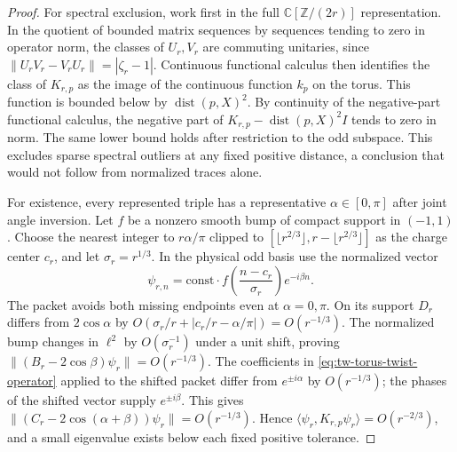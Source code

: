 \begin{proof}
For spectral exclusion, work first in the full
\(\mathbb C[\mathbb Z/(2r)]\) representation.  In the quotient of bounded
matrix sequences by sequences tending to zero in operator norm, the
classes of \(U_r,V_r\) are commuting unitaries, since
\(\|U_rV_r-V_rU_r\|=|\zeta_r-1|\).
Continuous functional calculus then identifies the class of \(K_{r,p}\)
as the image of the continuous function \(k_p\) on the torus.  This
function is bounded below by \(\operatorname{dist}(p,X)^2\).
By continuity of the negative-part functional calculus, the negative
part of \(K_{r,p}-\operatorname{dist}(p,X)^2 I\) tends to zero in norm.
The same lower bound holds after restriction to the odd subspace.
This excludes sparse spectral outliers at any fixed positive distance,
a conclusion that would not follow from normalized traces alone.

For existence, every represented triple has a representative
\(\alpha\in[0,\pi]\) after joint angle inversion.  Let \(f\) be a nonzero
smooth bump of compact support in \((-1,1)\).  Choose the nearest integer
to \(r\alpha/\pi\) clipped to
\([\lfloor r^{2/3}\rfloor,r-\lfloor r^{2/3}\rfloor]\) as the charge
center \(c_r\), and let \(\sigma_r=r^{1/3}\).  In the physical odd
basis use the normalized vector
\[
 \psi_{r,n}=\mathrm{const}\cdot f\!\left(\frac{n-c_r}{\sigma_r}\right)
                 e^{-i\beta n}.
\]
The packet avoids both missing endpoints even at \(\alpha=0,\pi\).
On its support \(D_r\) differs from \(2\cos\alpha\) by
\(O(\sigma_r/r+|c_r/r-\alpha/\pi|)=O(r^{-1/3})\).
The normalized bump changes in \(\ell^2\) by \(O(\sigma_r^{-1})\)
under a unit shift, proving
\(\|(B_r-2\cos\beta)\psi_r\|=O(r^{-1/3})\).
The coefficients in \eqref{eq:tw-torus-twist-operator} applied to the
shifted packet differ from \(e^{\pm i\alpha}\) by \(O(r^{-1/3})\);
the phases of the shifted vector supply \(e^{\pm i\beta}\).
This gives
\(\|(C_r-2\cos(\alpha+\beta))\psi_r\|=O(r^{-1/3})\).
Hence \(\langle\psi_r,K_{r,p}\psi_r\rangle=O(r^{-2/3})\), and a
small eigenvalue exists below each fixed positive tolerance.


\end{proof}
